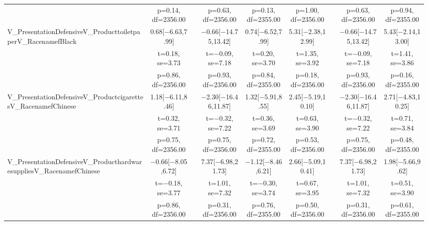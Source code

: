 \documentclass[]{report}
\begin{document}
\begin{table}
{\begin{tabular}[t]{lcccccccc}
		& p=\num{0.14}, df=\num{2356.00} &  & p=\num{0.63}, df=\num{2356.00} & p=\num{0.13}, df=\num{2355.00} & p=\num{1.00}, df=\num{2356.00} &  & p=\num{0.63}, df=\num{2356.00} & p=\num{0.94}, df=\num{2355.00}\\
		V\_PresentationDefensiveV\_ProducttoiletpaperV\_RacenamefBlack & \num{0.68}[\num{-6.63},\num{7.99}] &  & \num{-0.66}[\num{-14.75},\num{13.42}] & \num{0.74}[\num{-6.52},\num{7.99}] & \num{5.31}[\num{-2.38},\num{12.99}] &  & \num{-0.66}[\num{-14.75},\num{13.42}] & \num{5.43}[\num{-2.14},\num{13.00}]\\
		& t=\num{0.18}, se=\num{3.73} &  & t=\num{-0.09}, se=\num{7.18} & t=\num{0.20}, se=\num{3.70} & t=\num{1.35}, se=\num{3.92} &  & t=\num{-0.09}, se=\num{7.18} & t=\num{1.41}, se=\num{3.86}\\
		& p=\num{0.86}, df=\num{2356.00} &  & p=\num{0.93}, df=\num{2356.00} & p=\num{0.84}, df=\num{2355.00} & p=\num{0.18}, df=\num{2356.00} &  & p=\num{0.93}, df=\num{2356.00} & p=\num{0.16}, df=\num{2355.00}\\
		V\_PresentationDefensiveV\_ProductcigarettesV\_RacenamefChinese & \num{1.18}[\num{-6.11},\num{8.46}] &  & \num{-2.30}[\num{-16.46},\num{11.87}] & \num{1.32}[\num{-5.91},\num{8.55}] & \num{2.45}[\num{-5.19},\num{10.10}] &  & \num{-2.30}[\num{-16.46},\num{11.87}] & \num{2.71}[\num{-4.83},\num{10.25}]\\
		& t=\num{0.32}, se=\num{3.71} &  & t=\num{-0.32}, se=\num{7.22} & t=\num{0.36}, se=\num{3.69} & t=\num{0.63}, se=\num{3.90} &  & t=\num{-0.32}, se=\num{7.22} & t=\num{0.71}, se=\num{3.84}\\
		& p=\num{0.75}, df=\num{2356.00} &  & p=\num{0.75}, df=\num{2356.00} & p=\num{0.72}, df=\num{2355.00} & p=\num{0.53}, df=\num{2356.00} &  & p=\num{0.75}, df=\num{2356.00} & p=\num{0.48}, df=\num{2355.00}\\
		V\_PresentationDefensiveV\_ProducthardwaresuppliesV\_RacenamefChinese & \num{-0.66}[\num{-8.05},\num{6.72}] &  & \num{7.37}[\num{-6.98},\num{21.73}] & \num{-1.12}[\num{-8.46},\num{6.21}] & \num{2.66}[\num{-5.09},\num{10.41}] &  & \num{7.37}[\num{-6.98},\num{21.73}] & \num{1.98}[\num{-5.66},\num{9.62}]\\
		& t=\num{-0.18}, se=\num{3.77} &  & t=\num{1.01}, se=\num{7.32} & t=\num{-0.30}, se=\num{3.74} & t=\num{0.67}, se=\num{3.95} &  & t=\num{1.01}, se=\num{7.32} & t=\num{0.51}, se=\num{3.90}\\
		& p=\num{0.86}, df=\num{2356.00} &  & p=\num{0.31}, df=\num{2356.00} & p=\num{0.76}, df=\num{2355.00} & p=\num{0.50}, df=\num{2356.00} &  & p=\num{0.31}, df=\num{2356.00} & p=\num{0.61}, df=\num{2355.00}\\

\end{tabular}}
\end{table}
\end{document}
